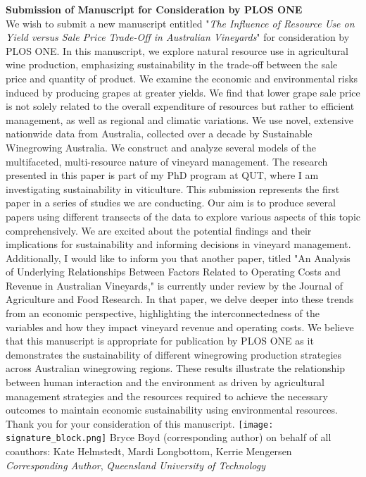 \documentclass{article}
\begin{document}
\centering \textbf{Submission of Manuscript for Consideration by PLOS ONE}\\
\bigskip %
\justifying
We wish to submit a new manuscript entitled "\textit{The Influence of Resource Use on Yield versus Sale Price Trade-Off in Australian Vineyards}" for consideration by PLOS ONE.
\newline \noindent
In this manuscript, we explore natural resource use in agricultural wine production, emphasizing sustainability in the trade-off between the sale price and quantity of product. We examine the economic and environmental risks induced by producing grapes at greater yields. We find that lower grape sale price is not solely related to the overall expenditure of resources but rather to efficient management, as well as regional and climatic variations. We use novel, extensive nationwide data from Australia, collected over a decade by Sustainable Winegrowing Australia. We construct and analyze several models of the multifaceted, multi-resource nature of vineyard management.
\newline \noindent
The research presented in this paper is part of my PhD program at QUT, where I am investigating sustainability in viticulture. This submission represents the first paper in a series of studies we are conducting. Our aim is to produce several papers using different transects of the data to explore various aspects of this topic comprehensively. We are excited about the potential findings and their implications for sustainability and informing decisions in vineyard management.
\newline \noindent
Additionally, I would like to inform you that another paper, titled "An Analysis of Underlying Relationships Between Factors Related to Operating Costs and Revenue in Australian Vineyards," is currently under review by the Journal of Agriculture and Food Research. In that paper, we delve deeper into these trends from an economic perspective, highlighting the interconnectedness of the variables and how they impact vineyard revenue and operating costs.
\newline \noindent
We believe that this manuscript is appropriate for publication by PLOS ONE as it demonstrates the sustainability of different winegrowing production strategies across Australian winegrowing regions. These results illustrate the relationship between human interaction and the environment as driven by agricultural management strategies and the resources required to achieve the necessary outcomes to maintain economic sustainability using environmental resources. Thank you for your consideration of this manuscript.
\newline \noindent%
\texttt{[image: signature\_block.png]}
\newline \noindent
Bryce Boyd (corresponding author) on behalf of all coauthors: Kate Helmstedt, Mardi Longbottom, Kerrie Mengersen\\
\newline \noindent
\textit{Corresponding Author}, \textit{Queensland University of Technology}
\end{document}
